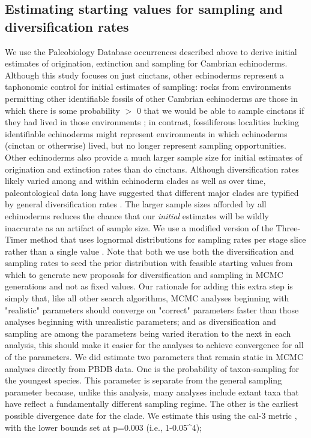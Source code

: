 \documentclass{article}
\begin{document}
\subsection{Estimating starting values for sampling and diversification rates}
We use the Paleobiology Database occurrences described above to derive initial estimates of origination, extinction and sampling for Cambrian echinoderms.  Although this study focuses on just cinctans, other echinoderms represent a taphonomic control for initial estimates of sampling: rocks from environments permitting other identifiable fossils of other Cambrian echinoderms are those in which there is some probability $>$ 0 that we would be able to sample cinctans if they had lived in those environments \cite{BottjerJablonski1988}; in contrast, fossiliferous localities lacking identifiable echinoderms might represent environments in which echinoderms (cinctan or otherwise) lived, but no longer represent sampling opportunities. Other echinoderms also provide a much larger sample size for initial estimates of origination and extinction rates than do cinctans. Although diversification rates likely varied among and within echinoderm clades as well as over time, paleontological data long have suggested that different major clades are typified by general diversification rates \cite{Sepkoski1981}. The larger sample sizes afforded by all echinoderms reduces the chance that our \textit{initial} estimates will be wildly inaccurate as an artifact of sample size. We use a modified version of the Three-Timer method \citep{Alroy2015} that uses lognormal distributions for sampling rates per stage slice rather than a single value \citep{WagnerMarcot2013}. Note that both we use both the diversification and sampling rates to seed the prior distribution with feasible starting values from which to generate new proposals for diversification and sampling in MCMC generations and not as fixed values. Our rationale for adding this extra step is simply that, like all other search algorithms, MCMC analyses beginning with "realistic" parameters should converge on "correct" parameters faster than those analyses beginning with unrealistic parameters; and as diversification and sampling are among the parameters being varied iteration to the next  in each analysis, this should make it easier for the analyses to achieve convergence for all of the parameters. We did estimate two parameters that remain static in MCMC analyses directly from PBDB data. One is the probability of taxon-sampling for the youngest species. This parameter is separate from the general sampling parameter because, unlike this analysis, many analyses include extant taxa that have reflect a fundamentally different sampling regime. The other is the earliest possible divergence date for the clade.  We estimate this using the cal-3 metric \citep{Bapst2013}, with the lower bounds set at p=0.003 (i.e., 1-0.05^4); 
\end{document}
